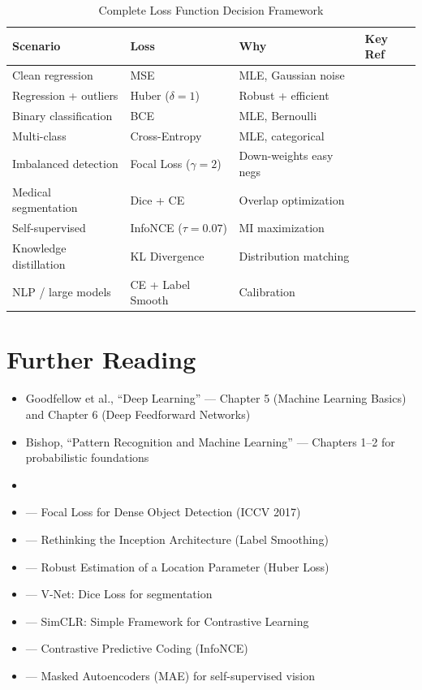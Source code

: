 \begin{table}[ht]
    \centering
    \caption{Complete Loss Function Decision Framework}
    \begin{tabular}{L{3cm} L{3cm} L{4cm} L{3cm}}
        \toprule
        \textbf{Scenario} & \textbf{Loss} & \textbf{Why} & \textbf{Key Ref} \\
        \midrule
        Clean regression & MSE & MLE, Gaussian noise & \\
        Regression + outliers & Huber ($\delta=1$) & Robust + efficient & \cite{huber1964robust} \\
        Binary classification & BCE & MLE, Bernoulli & \\
        Multi-class & Cross-Entropy & MLE, categorical & \\
        Imbalanced detection & Focal Loss ($\gamma=2$) & Down-weights easy negs & \cite{lin2017focal} \\
        Medical segmentation & Dice + CE & Overlap optimization & \cite{milletari2016v} \\
        Self-supervised & InfoNCE ($\tau=0.07$) & MI maximization & \cite{chen2020simple} \\
        Knowledge distillation & KL Divergence & Distribution matching & \\
        NLP / large models & CE + Label Smooth & Calibration & \cite{szegedy2016rethinking} \\
        \bottomrule
    \end{tabular}
\end{table}

\section{Further Reading}

\begin{itemize}
    \item Goodfellow et al., ``Deep Learning'' \cite{goodfellow2016deep} --- Chapter 5 (Machine Learning Basics) and Chapter 6 (Deep Feedforward Networks)
    \item Bishop, ``Pattern Recognition and Machine Learning'' \cite{bishop2006pattern} --- Chapters 1--2 for probabilistic foundations
    \item     \item \cite{lin2017focal} --- Focal Loss for Dense Object Detection (ICCV 2017)
    \item \cite{szegedy2016rethinking} --- Rethinking the Inception Architecture (Label Smoothing)
    \item \cite{huber1964robust} --- Robust Estimation of a Location Parameter (Huber Loss)
    \item \cite{milletari2016v} --- V-Net: Dice Loss for segmentation
    \item \cite{chen2020simple} --- SimCLR: Simple Framework for Contrastive Learning
    \item \cite{oord2018representation} --- Contrastive Predictive Coding (InfoNCE)
    \item \cite{he2020masked} --- Masked Autoencoders (MAE) for self-supervised vision
\end{itemize}
